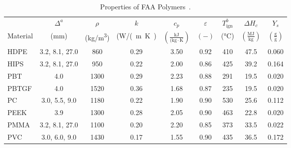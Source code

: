 \begin{table}[!h]
\caption[Properties of FAA Polymers]{Properties of FAA Polymers~\cite{Stoliarov:CF2009,Stoliarov:FM2012}.}
\centering
\begin{tabular}{|p{2.5cm}|c|c|c|c|c|c|c|c|}
\hline
            & $\Delta^{a}$& $\rho$& $k$& $c_{p}$& $\varepsilon$& $T_{\mathrm{ign}}^{b}$&$\Delta H_{c}$& $Y_{s}$ \\
Material    & (mm) & (\unit{kg/m^3}) & (\unit{W/(m.K)} & $\mathrm{\left(\frac{kJ}{(kg\cdot K}\right)}$ & $\mathrm{( - )}$ &  (\unit{\degreeCelsius})   & $\left(\mathrm{\frac{MJ}{kg}}\right)$ & $\mathrm{\left(\frac{g}{g}\right)}$ \\ \hline
\hline
HDPE                                              & 3.2, 8.1, 27.0 & 860  & 0.29 & 3.50 & 0.92 & 410 & 47.5 & 0.060 \\\hline
HIPS                                              & 3.2, 8.1, 27.0 & 950  & 0.22 & 2.00 & 0.86 & 425 & 39.2 & 0.164 \\\hline
PBT                                               & 4.0            & 1300 & 0.29 & 2.23 & 0.88 & 291 & 19.5 & 0.020 \\\hline
PBTGF                                             & 4.0            & 1520 & 0.36 & 1.68 & 0.87 & 235 & 19.5 & 0.020 \\\hline
PC                                                & 3.0, 5.5, 9.0  & 1180 & 0.22 & 1.90 & 0.90 & 530 & 25.6 & 0.112 \\\hline
PEEK                                              & 3.9            & 1300 & 0.28 & 2.05 & 0.90 & 463 & 22.8 & 0.020 \\\hline
PMMA                                              & 3.2, 8.1, 27.0 & 1100 & 0.20 & 2.20 & 0.85 & 373 & 33.5 & 0.022 \\\hline
PVC                                               & 3.0, 6.0, 9.0  & 1430 & 0.17 & 1.55 & 0.90 & 435 & 36.5 & 0.172 \\\hline
\end{tabular}
\label{Properties_FAA_Polymers_All}
\end{table}
\vspace{-0.4cm}
\\
 \\

